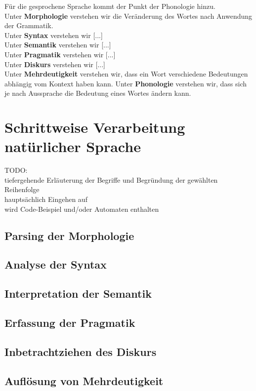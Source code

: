 \documentclass[12pt,twoside]{article}
\theoremstyle{plain}
\theoremstyle{definition}
\theoremstyle{remark}
\begin{document}
Für die gesprochene Sprache kommt der Punkt der Phonologie hinzu.\\
Unter \textbf{Morphologie} verstehen wir die Veränderung des Wortes nach Anwendung der Grammatik. \\
Unter \textbf{Syntax} verstehen wir [...]\\
Unter \textbf{Semantik} verstehen wir [...]\\
Unter \textbf{Pragmatik} verstehen wir [...]\\
Unter \textbf{Diskurs} verstehen wir [...]\\
Unter \textbf{Mehrdeutigkeit} verstehen wir, dass ein Wort verschiedene Bedeutungen abhängig vom Kontext haben kann.
Unter \textbf{Phonologie} verstehen wir, dass sich je nach Aussprache die Bedeutung eines Wortes ändern kann.\\
\section{Schrittweise Verarbeitung natürlicher Sprache}
\label{sec:meth}
TODO:\\
tiefergehende Erläuterung der Begriffe und Begründung der gewählten Reihenfolge\\
hauptsächlich Eingehen auf \cite{Jur2009}\\
wird Code-Beispiel und/oder Automaten enthalten
	\subsection{Parsing der Morphologie}
	\label{ssec:morph}
	\subsection{Analyse der Syntax}
	\label{ssec:syntax}
	\subsection{Interpretation der Semantik}
	\label{sec:sem}
	\subsection{Erfassung der Pragmatik}
	\label{ssec:prag}
	\subsection{Inbetrachtziehen des Diskurs}
	\label{ssec:disc}
	\subsection{Auflösung von Mehrdeutigkeit}
	\label{ssec:ambi}
\end{document}
